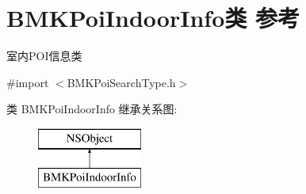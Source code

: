 \hypertarget{interface_b_m_k_poi_indoor_info}{}\section{B\+M\+K\+Poi\+Indoor\+Info类 参考}
\label{interface_b_m_k_poi_indoor_info}


室内\+P\+O\+I信息类  




{\ttfamily \#import $<$B\+M\+K\+Poi\+Search\+Type.\+h$>$}

类 B\+M\+K\+Poi\+Indoor\+Info 继承关系图\+:\begin{figure}[H]
\begin{center}
\leavevmode
\includegraphics[height=2.000000cm]{interface_b_m_k_poi_indoor_info}
\end{center}
\end{figure}
